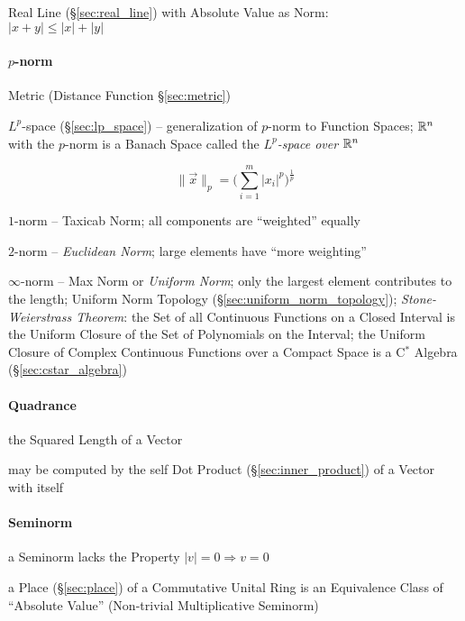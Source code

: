 Real Line (\S\ref{sec:real_line}) with Absolute Value as Norm:\\
$|x + y| \leq |x| + |y|$



\paragraph{$p$-norm}\label{sec:p_norm}\hfill

\fist Metric (Distance Function \S\ref{sec:metric})

\fist $L^p$-space (\S\ref{sec:lp_space}) -- generalization of $p$-norm to
Function Spaces;
$\mathbb{R}^n$ with the $p$-norm is a Banach Space called the
\emph{$L^p$-space over $\mathbb{R}^n$}

\[
  \|\vec{x}\|_p = \Big(\sum_{i=1}^m|x_i|^p\Big)^{\frac{1}{p}}
\]

$1$-norm -- Taxicab Norm; all components are ``weighted'' equally

$2$-norm -- \emph{Euclidean Norm}; large elements have ``more weighting''

$\infty$-norm -- Max Norm or \emph{Uniform Norm}; only the largest element
contributes to the length; Uniform Norm Topology
(\S\ref{sec:uniform_norm_topology}); \emph{Stone-Weierstrass Theorem}: the Set
of all Continuous Functions on a Closed Interval is the Uniform Closure of the
Set of Polynomials on the Interval;
the Uniform Closure of Complex Continuous Functions over a Compact Space is a
C$^*$ Algebra (\S\ref{sec:cstar_algebra})



\paragraph{Quadrance}\label{sec:quadrance}\hfill

the Squared Length of a Vector

may be computed by the self Dot Product (\S\ref{sec:inner_product}) of a Vector
with itself



\paragraph{Seminorm}\label{sec:seminorm}\hfill

a Seminorm lacks the Property $|v| = 0 \Longrightarrow v = 0$

\fist a Place (\S\ref{sec:place}) of a Commutative Unital Ring is an
Equivalence Class of ``Absolute Value'' (Non-trivial Multiplicative Seminorm)



